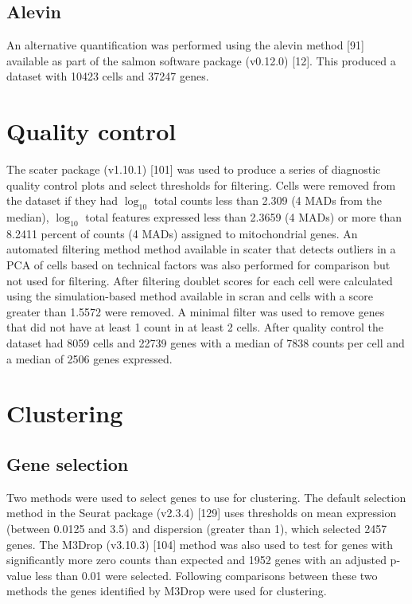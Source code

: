 \documentclass[11pt,a4paper,titlepage,twoside,openright]{style/unimelbthesis}
\theoremstyle{definition}
\theoremstyle{definition}
\theoremstyle{definition}
\theoremstyle{remark}
\begin{document}
\begin{mainmatter}
\hypertarget{alevin}{%
\subsection{Alevin}\label{alevin}}

An alternative quantification was performed using the alevin method {[}91{]} available as part of the salmon software package (v0.12.0) {[}12{]}. This produced a dataset with 10423 cells and 37247 genes.

\hypertarget{quality-control-1}{%
\section{Quality control}\label{quality-control-1}}

The scater package (v1.10.1) {[}101{]} was used to produce a series of diagnostic quality control plots and select thresholds for filtering. Cells were removed from the dataset if they had \(\log_{10}\) total counts less than 2.309 (4 MADs from the median), \(\log_{10}\) total features expressed less than 2.3659 (4 MADs) or more than 8.2411 percent of counts (4 MADs) assigned to mitochondrial genes. An automated filtering method method available in scater that detects outliers in a PCA of cells based on technical factors was also performed for comparison but not used for filtering. After filtering doublet scores for each cell were calculated using the simulation-based method available in scran and cells with a score greater than 1.5572 were removed. A minimal filter was used to remove genes that did not have at least 1 count in at least 2 cells. After quality control the dataset had 8059 cells and 22739 genes with a median of 7838 counts per cell and a median of 2506 genes expressed.

\hypertarget{clustering-1}{%
\section{Clustering}\label{clustering-1}}

\hypertarget{gene-selection-1}{%
\subsection{Gene selection}\label{gene-selection-1}}

Two methods were used to select genes to use for clustering. The default selection method in the Seurat package (v2.3.4) {[}129{]} uses thresholds on mean expression (between 0.0125 and 3.5) and dispersion (greater than 1), which selected 2457 genes. The M3Drop (v3.10.3) {[}104{]} method was also used to test for genes with significantly more zero counts than expected and 1952 genes with an adjusted p-value less than 0.01 were selected. Following comparisons between these two methods the genes identified by M3Drop were used for clustering.


\end{mainmatter}
\end{document}
